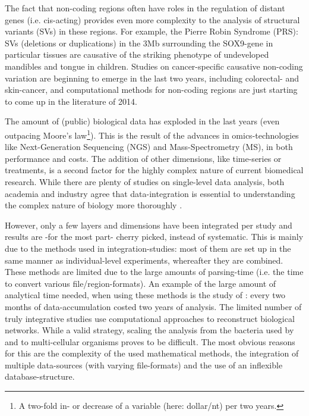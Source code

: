 \documentclass[twoside,fontsize=10pt]{article}
\begin{document}
The fact that non-coding regions often have roles in the regulation of distant genes (i.e. cis-acting) provides even more complexity to the analysis of structural variants (SVs) in these regions. For example, the Pierre Robin Syndrome (PRS): SVs (deletions or duplications) in the 3Mb surrounding the SOX9-gene in particular tissues are causative of the striking phenotype of undeveloped mandibles and tongue in children\cite{Benko2009,Kurth2009}. Studies on cancer-specific causative non-coding variation are beginning to emerge in the last two years, including colorectal- and skin-cancer\cite{Ongen2014,Huang2013}, and computational methods for non-coding regions are just starting to come up in the literature of 2014\cite{Khurana2013,Kircher2014}.  
\medskip

\noindent
The amount of (public) biological data has exploded in the last years (even outpacing Moore's law\footnote{A two-fold in- or decrease of a variable (here: dollar/nt) per two years.}). This is the result of the advances in omics-technologies like Next-Generation Sequencing (NGS) and Mass-Spectrometry (MS), in both performance and costs. The addition of other dimensions, like time-series or treatments, is a second factor for the highly complex nature of current biomedical research. While there are plenty of studies on single-level data analysis, both academia and industry agree that data-integration is essential to understanding the complex nature of biology more thoroughly \citep{Gomez-Cabrero2014, Huttenhower2010, Searls2005, Hamid2009}. 

However, only a few layers and dimensions have been integrated per study and results are -for the most part- cherry picked, instead of systematic. This is mainly due to the methods used in integration-studies: most of them are set up in the same manner as individual-level experiments, whereafter they are combined. These methods are limited due to the large amounts of parsing-time (i.e. the time to convert various file/region-formats). An example of the large amount of analytical time needed, when using these methods is the study of \citet{Munoz2011}: every two months of data-accumulation costed two years of analysis. The limited number of truly integrative studies use computational approaches to reconstruct biological networks. While a valid strategy, scaling the analysis from the bacteria used by \citet{Karr2012} and \citet{Lerman2012} to multi-cellular organisms proves to be difficult. The most obvious reasons for this are the complexity of the used mathematical methods, the integration of multiple data-sources (with varying file-formats) and the use of an inflexible database-structure.
\medskip
\end{document}
